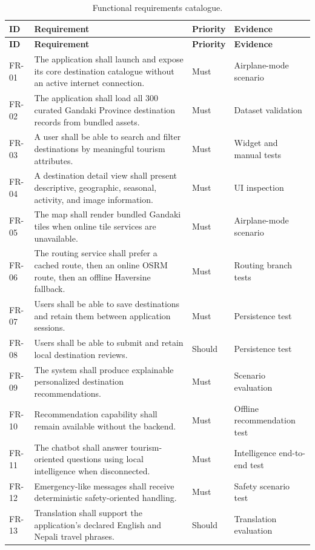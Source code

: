 \begin{longtable}{p{1.4cm}p{8.7cm}p{2.0cm}p{2.2cm}}
\caption{Functional requirements catalogue.}\label{tbl:functional_requirements}\\
\toprule
\textbf{ID} & \textbf{Requirement} & \textbf{Priority} & \textbf{Evidence} \\
\midrule
\endfirsthead
\toprule
\textbf{ID} & \textbf{Requirement} & \textbf{Priority} & \textbf{Evidence} \\
\midrule
\endhead
FR-01 & The application shall launch and expose its core destination catalogue without an active internet connection. & Must & Airplane-mode scenario \\
FR-02 & The application shall load all 300 curated Gandaki Province destination records from bundled assets. & Must & Dataset validation \\
FR-03 & A user shall be able to search and filter destinations by meaningful tourism attributes. & Must & Widget and manual tests \\
FR-04 & A destination detail view shall present descriptive, geographic, seasonal, activity, and image information. & Must & UI inspection \\
FR-05 & The map shall render bundled Gandaki tiles when online tile services are unavailable. & Must & Airplane-mode scenario \\
FR-06 & The routing service shall prefer a cached route, then an online OSRM route, then an offline Haversine fallback. & Must & Routing branch tests \\
FR-07 & Users shall be able to save destinations and retain them between application sessions. & Must & Persistence test \\
FR-08 & Users shall be able to submit and retain local destination reviews. & Should & Persistence test \\
FR-09 & The system shall produce explainable personalized destination recommendations. & Must & Scenario evaluation \\
FR-10 & Recommendation capability shall remain available without the backend. & Must & Offline recommendation test \\
FR-11 & The chatbot shall answer tourism-oriented questions using local intelligence when disconnected. & Must & Intelligence end-to-end test \\
FR-12 & Emergency-like messages shall receive deterministic safety-oriented handling. & Must & Safety scenario test \\
FR-13 & Translation shall support the application's declared English and Nepali travel phrases. & Should & Translation evaluation \\

\end{longtable}
